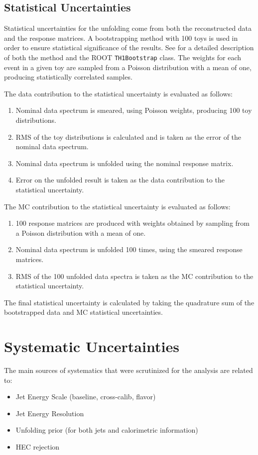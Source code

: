 \documentclass[NOTE, atlasdraft=true, texlive=2020, UKenglish]{atlasdoc}
\begin{document}
\subsection{Statistical Uncertainties} 
Statistical uncertainties for the unfolding come from both the reconstructed data and the response matrices. A bootstrapping method with 100 toys is used in order to ensure statistical significance of the results. See \cite{ATL-PHYS-PUB-2021-011} for a detailed description of both the method and the ROOT \texttt{TH1Bootstrap} class. The weights for each event in a given toy are sampled from a Poisson distribution with a mean of one, producing statistically correlated samples. 

The data contribution to the statistical uncertainty is evaluated as follows:
\begin{enumerate}
    \item Nominal data spectrum is smeared, using Poisson weights, producing 100 toy distributions. 
    \item RMS of the toy distributions is calculated and is taken as the error of the nominal data spectrum. 
    \item Nominal data spectrum is unfolded using the nominal response matrix.
    \item Error on the unfolded result is taken as the data contribution to the statistical uncertainty.
\end{enumerate}
The MC contribution to the statistical uncertainty is evaluated as follows: 
\begin{enumerate}
    \item 100 response matrices are produced with weights obtained by sampling from a Poisson distribution with a mean of one.
    \item Nominal data spectrum is unfolded 100 times, using the smeared response matrices. 
    \item RMS of the 100 unfolded data spectra is taken as the MC contribution to the statistical uncertainty.
\end{enumerate}
The final statistical uncertainty is calculated by taking the quadrature sum of the bootstrapped data and MC statistical uncertainties. 


\clearpage{}
\clearpage{}\section{Systematic Uncertainties} 
\label{sec:systematics}
The main sources of systematics that were scrutinized for the analysis are related to: 
\begin{itemize}
    \item Jet Energy Scale (baseline, cross-calib, flavor)
    \item Jet Energy Resolution
    \item Unfolding prior (for both jets and calorimetric information)
    \item HEC rejection
\end{itemize}
\end{document}
